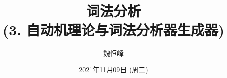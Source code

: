 \documentclass[]{beamer}
\title[词法分析]{词法分析 \\ (3. 自动机理论与词法分析器生成器)}
\author[魏恒峰]{\large 魏恒峰}
\institute{hfwei@nju.edu.cn}
\date{2021年11月09日 (周二)}
\begin{document}
\maketitle


\thankyou{}

\end{document}
